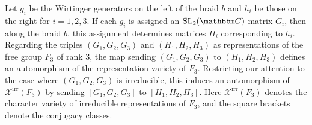 \documentclass[12pt,reqno]{amsart}
\theoremstyle{definition}
\def\BC{\mathbbm C}
\def\calX{\mathcal X}
\def\SL{\mathrm{SL}}
\begin{document}
Let $g_i$ be the Wirtinger generators on the left of the braid $b$ and 
$h_i$ be those on the right for $i=1,2,3$. If each $g_i$ is assigned an $\SL_2(\BC)$-matrix $G_i$, then along the braid $b$, this assignment determines matrices $H_i$ corresponding to $h_i$.  Regarding the triples $(G_1,G_2,G_3)$ and $(H_1,H_2,H_3)$ as representations of the free group $F_3$ of rank 3, the map sending $(G_1,G_2,G_3)$ to $(H_1,H_2,H_3)$ defines an automorphism of the representation variety of $F_3$. Restricting our attention to the case where $(G_1,G_2,G_3)$ is irreducible, this induces an automorphism of $\calX^{\mathrm{irr}}(F_3)$ by sending $[G_1,G_2,G_3]$ to $[H_1,H_2,H_3]$. Here  $\calX^{\mathrm{irr}}(F_3)$ denotes the character variety  of irreducible representations of $F_3$, and the square brackets denote the conjugacy classes.
\end{document}
